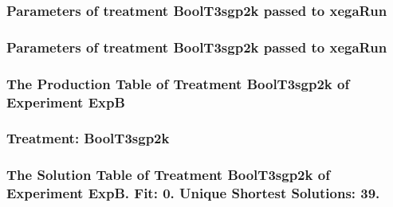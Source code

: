 \documentclass[18pt,c]{beamer}
\begin{document}

 \begin{frame}
 \fontsize{8pt}{9pt}\selectfont
 \frametitle{  Parameters of treatment BoolT3sgp2k passed to xegaRun
 }

 \label{ExpBtParmTable062.tex}  
 \end{frame}


 \begin{frame}
 \fontsize{8pt}{9pt}\selectfont
 \frametitle{  Parameters of treatment BoolT3sgp2k passed to xegaRun
 }

 \label{ExpBtParmTable063.tex}  
 \end{frame}

 \begin{frame}
 \fontsize{8pt}{9pt}\selectfont
 \frametitle{ The Production Table of Treatment BoolT3sgp2k of Experiment ExpB }

 \label{ExpBGrammarTable018.tex}  
 \end{frame}

 \begin{frame}
 \fontsize{8pt}{9pt}\selectfont
 \frametitle{ Treatment: BoolT3sgp2k }

 \label{ExpBStatsTable022.tex}  
 \end{frame}

 \begin{frame}
 \fontsize{8pt}{9pt}\selectfont
 \frametitle{ The Solution Table of Treatment BoolT3sgp2k of Experiment ExpB. Fit: 0. Unique Shortest Solutions: 39. }

 \label{ExpBSolutionTable015.tex}  
 \end{frame}
\end{document}
